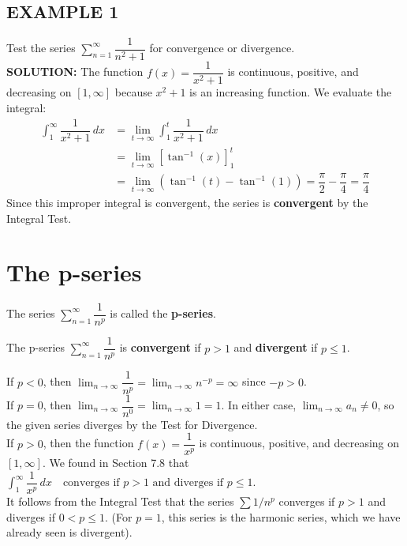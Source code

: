 \documentclass{article}
\begin{document}
\subsection*{EXAMPLE 1}
Test the series \( \sum_{n=1}^{\infty} \dfrac{1}{n^2+1} \) for convergence or divergence.\\
\textbf{SOLUTION:}
The function \(f(x) = \dfrac{1}{x^2+1}\) is continuous, positive, and decreasing on \([1, \infty]\) because \(x^2+1\) is an increasing function. We evaluate the integral:
\begin{align*}
    \int_1^\infty \dfrac{1}{x^2+1} \,dx &= \lim_{t\to\infty} \int_1^t \dfrac{1}{x^2+1} \,dx \\
    &= \lim_{t\to\infty} \left[ \tan^{-1}(x) \right]_1^t \\
    &= \lim_{t\to\infty} (\tan^{-1}(t) - \tan^{-1}(1)) = \dfrac{\pi}{2} - \dfrac{\pi}{4} = \dfrac{\pi}{4}
\end{align*}
Since this improper integral is convergent, the series is \textbf{convergent} by the Integral Test.

\section*{The p-series}
The series \( \sum_{n=1}^{\infty} \dfrac{1}{n^p} \) is called the \textbf{p-series}.

\begin{tcolorbox}[
    colback=white,
    colframe=orange!80!white,
    title=Convergence of a p-series,
    boxrule=0.5mm,
    arc=3mm
    ]
    The p-series \( \sum_{n=1}^{\infty} \dfrac{1}{n^p} \) is \textbf{convergent} if \(p > 1\) and \textbf{divergent} if \(p \le 1\).
\end{tcolorbox}

If \(p < 0\), then \( \lim_{n\to\infty} \dfrac{1}{n^p} = \lim_{n\to\infty} n^{-p} = \infty \) since \(-p > 0\).\\
If \(p = 0\), then \( \lim_{n\to\infty} \dfrac{1}{n^0} = \lim_{n\to\infty} 1 = 1 \). In either case, \( \lim_{n\to\infty} a_n \neq 0 \), so the given series diverges by the Test for Divergence.\\
If \(p > 0\), then the function \( f(x) = \dfrac{1}{x^p} \) is continuous, positive, and decreasing on \([1, \infty]\). We found in Section 7.8 that
$ \int_1^\infty \dfrac{1}{x^p} \,dx \quad \text{converges if } p > 1 \text{ and diverges if } p \le 1.$\\
It follows from the Integral Test that the series \( \sum 1/n^p \) converges if \(p > 1\) and diverges if \(0 < p \le 1\). (For \(p=1\), this series is the harmonic series, which we have already seen is divergent).
\end{document}
